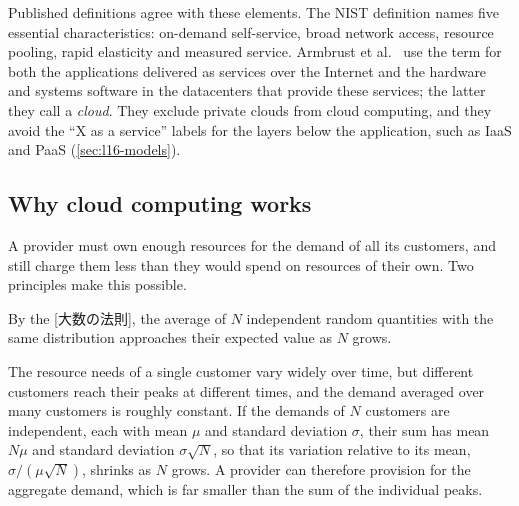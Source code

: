 \documentclass[../main.tex]{subfiles}
\begin{document}
\begin{note}
  Published definitions agree with these elements.  The NIST definition
  \cite{mell2011} names five essential characteristics: on-demand
  self-service, broad network access, resource pooling, rapid elasticity and
  measured service.  Armbrust et al.\ \cite{armbrust2009} use the term for
  both the applications delivered as services over the Internet and the
  hardware and systems software in the datacenters that provide these
  services; the latter they call a \emph{cloud}.  They exclude private
  clouds from cloud computing, and they avoid the ``X as a service'' labels
  for the layers below the application, such as IaaS and PaaS
  (\cref{sec:l16-models}).
\end{note}

\subsection{Why cloud computing works}

A provider must own enough resources for the demand of all its customers,
and still charge them less than they would spend on resources of their own.
Two principles make this possible.

\begin{definition}
  By the [大数の法則], the average of $N$
  independent random quantities with the same distribution approaches their
  expected value as $N$ grows.
\end{definition}

The resource needs of a single customer vary widely over time, but different
customers reach their peaks at different times, and the demand averaged over
many customers is roughly constant.  If the demands of $N$ customers are
independent, each with mean $\mu$ and standard deviation $\sigma$, their sum
has mean $N\mu$ and standard deviation $\sigma\sqrt{N}$, so that its
variation relative to its mean, $\sigma/(\mu\sqrt{N})$, shrinks as $N$
grows.  A provider can therefore provision for the aggregate
demand, which is far smaller than the sum of the individual peaks.
\end{document}
